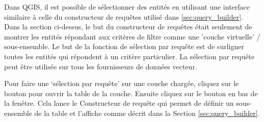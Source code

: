 Dans QGIS, il est possible de s\'electionner des entit\'es en utilisant une interface similaire \`a celle du constructeur de requ\^etes utilis\'e dans \ref{sec:query_builder}. Dans la section ci-dessus, le but du constructeur de requ\^etes \'etait seulement de montrer les entit\'es r\'epondant aux crit\`eres de filtre comme une 'couche virtuelle' / sous-ensemble. Le but de la fonction de s\'election par requ\^ete est de surligner toutes les entit\'es qui r\'epondent \`a un crit\`ere particulier. La s\'election par requ\^ete peut \^etre utilis\'ee sur tous les fournisseurs de donn\'ees vecteur.

Pour faire une `s\'election par requ\^ete' sur une couche charg\'ee, cliquez sur le bouton  pour ouvrir la table de la couche. Ensuite cliquez sur le bouton  en bas de la fen\^etre. Cela lance le Constructeur de requ\^ete qui permet de d\'efinir un sous-ensemble de la table et l'affiche comme d\'ecrit dans la Section \ref{sec:query_builder}.



